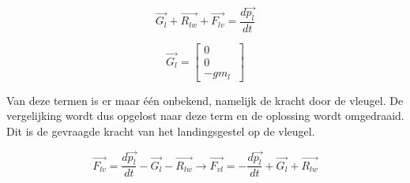 \begin{equation}
\overrightarrow{G_{l}}+\overrightarrow{R_{lw}}+\overrightarrow{F_{lv}}=\frac{d\overrightarrow{p_{l}}}{dt}
\end{equation}

\begin{equation*}
\overrightarrow{G_{l}}
=	\begin{bmatrix}
	0\\
	0\\
	-gm_{l}\
	\end{bmatrix}
\end{equation*}

Van deze termen is er maar \'e\'en onbekend, namelijk de kracht door de vleugel. De vergelijking wordt dus opgelost naar deze term en de oplossing wordt omgedraaid. Dit is de gevraagde kracht van het landingsgestel op de vleugel.

\begin{equation}
\overrightarrow{F_{lv}}=\frac{d\overrightarrow{p_{l}}}{dt}-\overrightarrow{G_{l}}-\overrightarrow{R_{lw}}\longrightarrow\overrightarrow{F_{vl}}=-\frac{d\overrightarrow{p_{l}}}{dt}+\overrightarrow{G_{l}}+\overrightarrow{R_{lw}}
\end{equation}


